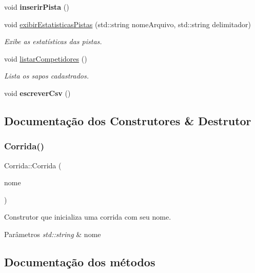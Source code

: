 \begin{DoxyCompactItemize}
\mbox{\label{classCorrida_aaf1bbb0164f24ca07f06f72257082cdb}} 
void {\bfseries inserir\+Pista} ()
\item 
void \hyperlink{classCorrida_a666c49414c3c8f350aa1efffbca6816a}{exibir\+Estatisticas\+Pistas} (std\+::string nome\+Arquivo, std\+::string delimitador)
\begin{DoxyCompactList}\small\item\em Exibe as estatísticas das pistas. \end{DoxyCompactList}\item 
void \hyperlink{classCorrida_a57cf1caa60f1dbcdc8a144cbe8cdc525}{listar\+Competidores} ()
\begin{DoxyCompactList}\small\item\em Lista os sapos cadastrados. \end{DoxyCompactList}\item 
\mbox{\label{classCorrida_aa3f1dcdd6d4d401ef3a4e4f18ba57f1f}} 
void {\bfseries escrever\+Csv} ()
\end{DoxyCompactItemize}


\subsection{Documentação dos Construtores \& Destrutor}
\mbox{\label{classCorrida_a007ea8b554b61d017f10d02ab1e10428}} 
\subsubsection{\texorpdfstring{Corrida()}{Corrida()}}
{\footnotesize\ttfamily Corrida\+::\+Corrida (\begin{DoxyParamCaption}\item[{std\+::string}]{nome }\end{DoxyParamCaption})}



Construtor que inicializa uma corrida com seu nome. 


\begin{DoxyParams}{Parâmetros}
{\em std\+::string} & nome \\
\hline
\end{DoxyParams}


\subsection{Documentação dos métodos}
\mbox{\label{classCorrida_a8bd6f41f4e0c7929c302feb13a01e0d5}} 
